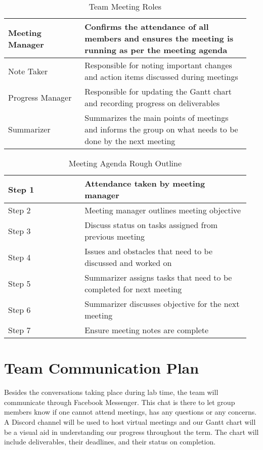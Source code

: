 \documentclass[12pt, titlepage]{article}
\begin{document}
\begin{table}[ht]
    \centering
    \begin{tabular}{| p{0.3\linewidth} | p{0.65\linewidth} |}
		\hline
		Meeting Manager	  & Confirms the attendance of all members and ensures the meeting is running as per the meeting agenda \\ \hline
		Note Taker             & Responsible for noting important changes and action items discussed during meetings \\ \hline
		Progress Manager    & Responsible for updating the Gantt chart and recording progress on deliverables\\ \hline
		Summarizer            & Summarizes the main points of meetings and informs the group on what needs to be done by the next meeting\\ \hline
    \end{tabular}
    \caption{Team Meeting Roles}
    \label{tab:my_label}
\end{table}

\begin{table}[ht]
    \centering
    \begin{tabular}{| p{0.3\linewidth} | p{0.65\linewidth} |}
		\hline
Step 1 & Attendance taken by meeting manager\\ \hline
Step 2 & Meeting manager outlines meeting objective\\ \hline 
Step 3 & Discuss status on tasks assigned from previous meeting\\ \hline 
Step 4 & Issues and obstacles that need to be discussed and worked on\\ \hline
Step 5 & Summarizer assigns tasks that need to be completed for next meeting\\ \hline  
Step 6 & Summarizer discusses objective for the next meeting \\ \hline
Step 7 & Ensure meeting notes are complete\\ \hline
    \end{tabular}
    \caption{Meeting Agenda Rough Outline}
    \label{tab:my_label}
\end{table}

\newpage
\section{Team Communication Plan}
Besides the conversations taking place during lab time, the team will communicate through Facebook Messenger. This chat is there to let group members know if one cannot attend meetings, has any questions or any concerns. A Discord channel will be used to host virtual meetings and our Gantt chart will be a visual aid in understanding our progress throughout the term. The chart will include deliverables, their deadlines, and their status on completion. 
\end{document}
